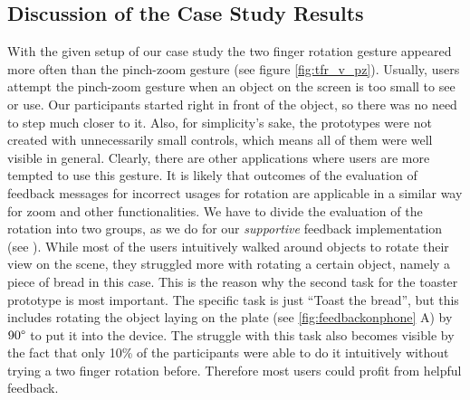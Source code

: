 \documentclass[11pt, a4paper]{article}
\begin{document}
		\subsection*{Discussion of the Case Study Results}\label{ssec:discussion}
			With the given setup of our case study the two finger rotation gesture appeared more often than the pinch-zoom gesture (see figure \ref{fig:tfr_v_pz}). Usually, users attempt the pinch-zoom gesture when an object on the screen is too small to see or use. Our participants started right in front of the object, so there was no need to step much closer to it. Also, for simplicity's sake, the prototypes were not created with unnecessarily small controls, which means all of them were well visible in general. Clearly, there are other applications where users are more tempted to use this gesture. It is likely that outcomes of the evaluation of feedback messages for incorrect usages for rotation are applicable in a similar way for zoom and other functionalities. We have to divide the evaluation of the rotation into two groups, as we do for our \emph{supportive} feedback implementation (see ). While most of the users intuitively walked around objects to rotate their view on the scene, they struggled more with rotating a certain object, namely a piece of bread in this case. This is the reason why the second task for the toaster prototype is most important. The specific task is just ``Toast the bread'', but this includes rotating the object laying on the plate (see \ref{fig:feedbackonphone} A) by $90\degree$ to put it into the device. The struggle with this task also becomes visible by the fact that only 10\% of the participants were able to do it intuitively without trying a two finger rotation before. Therefore most users could profit from helpful feedback.
\end{document}
